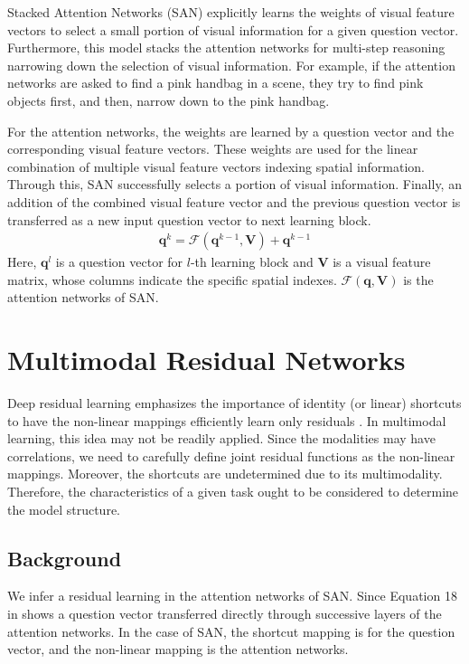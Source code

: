 \documentclass{article}
\newcommand{\vq}[0]{\mathbf{q}}
\newcommand{\mV}[0]{\mathbf{V}}
\begin{document}
Stacked Attention Networks (SAN) \cite{Yang2015} explicitly learns the weights of visual feature vectors to select a small portion of visual information for a given question vector. Furthermore, this model stacks the attention networks for multi-step reasoning narrowing down the selection of visual information. For example, if the attention networks are asked to find a pink handbag in a scene, they try to find pink objects first, and then, narrow down to the pink handbag. 

For the attention networks, the weights are learned by a question vector and the corresponding visual feature vectors. These weights are used for the linear combination of multiple visual feature vectors indexing spatial information. Through this, SAN successfully selects a portion of visual information. Finally, an addition of the combined visual feature vector and the previous question vector is transferred as a new input question vector to next learning block. \begin{align}
  \vq^{k} = \mathcal{F}(\vq^{k-1}, \mV) + \vq^{k-1}
\end{align}
Here, $\vq^{l}$ is a question vector for $l$-th learning block and $\mV$ is a visual feature matrix, whose columns indicate the specific spatial indexes. $\mathcal{F}(\vq,\mV)$ is the attention networks of SAN.

\section{Multimodal Residual Networks}
\label{sec:MRN}

Deep residual learning emphasizes the importance of identity (or linear) shortcuts to have the non-linear mappings efficiently learn only residuals \cite{He2015}. In multimodal learning, this idea may not be readily applied. Since the modalities may have correlations, we need to carefully define joint residual functions as the non-linear mappings. Moreover, the shortcuts are undetermined due to its multimodality. Therefore, the characteristics of a given task ought to be considered to determine the model structure.

\subsection{Background}
\label{subsec:background}

We infer a residual learning in the attention networks of SAN. Since Equation 18 in \cite{Yang2015} shows a question vector transferred directly through successive layers of the attention networks. In the case of SAN, the shortcut mapping is for the question vector, and the non-linear mapping is the attention networks.
\end{document}
